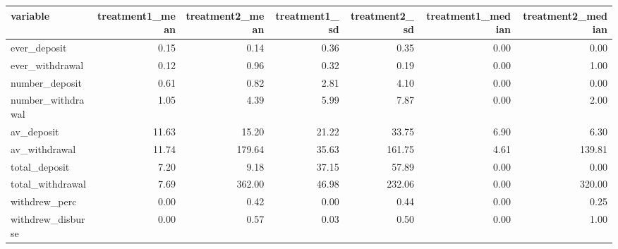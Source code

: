 
\begin{tabular}{lrrrrrr}
\toprule
variable & treatment1\_mean & treatment2\_mean & treatment1\_sd & treatment2\_sd & treatment1\_median & treatment2\_median\\
\midrule
ever\_deposit & 0.15 & 0.14 & 0.36 & 0.35 & 0.00 & 0.00\\
ever\_withdrawal & 0.12 & 0.96 & 0.32 & 0.19 & 0.00 & 1.00\\
number\_deposit & 0.61 & 0.82 & 2.81 & 4.10 & 0.00 & 0.00\\
number\_withdrawal & 1.05 & 4.39 & 5.99 & 7.87 & 0.00 & 2.00\\
av\_deposit & 11.63 & 15.20 & 21.22 & 33.75 & 6.90 & 6.30\\
\addlinespace
av\_withdrawal & 11.74 & 179.64 & 35.63 & 161.75 & 4.61 & 139.81\\
total\_deposit & 7.20 & 9.18 & 37.15 & 57.89 & 0.00 & 0.00\\
total\_withdrawal & 7.69 & 362.00 & 46.98 & 232.06 & 0.00 & 320.00\\
withdrew\_perc & 0.00 & 0.42 & 0.00 & 0.44 & 0.00 & 0.25\\
withdrew\_disburse & 0.00 & 0.57 & 0.03 & 0.50 & 0.00 & 1.00\\
\bottomrule
\end{tabular}
